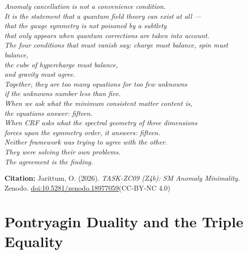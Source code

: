 \documentclass[12pt, a4paper]{article}
\begin{document}
\bigskip
\begin{center}
\textit{
Anomaly cancellation is not a convenience condition.\\
It is the statement that a quantum field theory can exist at all ---\\
that the gauge symmetry is not poisoned by a subtlety\\
that only appears when quantum corrections are taken into account.\\[0.5em]
The four conditions that must vanish say:
charge must balance, spin must balance,\\
the cube of hypercharge must balance,\\
and gravity must agree.\\
Together, they are too many equations for too few unknowns\\
if the unknowns number less than five.\\[0.5em]
When we ask what the minimum consistent matter content is,\\
the equations answer: fifteen.\\
When CRF asks what the spectral geometry of three dimensions\\
forces upon the symmetry order, it answers: fifteen.\\[0.5em]
Neither framework was trying to agree with the other.\\
They were solving their own problems.\\
The agreement is the finding.
}
\end{center}

\medskip
\begin{center}
\textbf{Citation:} Jarittum, O. (2026).
\textit{TASK-ZC09 (Z4b): SM Anomaly Minimality.}
Zenodo. \href{https://doi.org/10.5281/zenodo.18977059}%
{doi:10.5281/zenodo.18977059}\quad (CC-BY-NC 4.0)
\end{center}

\bigskip


\section{Pontryagin Duality and the Triple Equality}
\label{sec:zc10-pontryagin}
\end{document}
